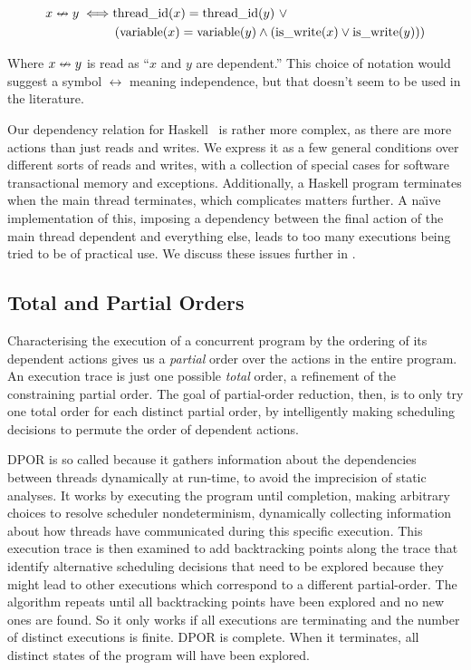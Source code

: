 \begin{align*}
  x \nleftrightarrow y \iff& \mathrm{thread\_id}(x) = \mathrm{thread\_id}(y)~\lor\\
    &\left(\mathrm{variable}(x) = \mathrm{variable}(y)
     \land \left(\mathrm{is\_write}(x) \lor \mathrm{is\_write}(y)\right)\right)
\end{align*}

Where $x \nleftrightarrow y$ is read as ``$x$ and $y$ are dependent.''  This
choice of notation would suggest a symbol $\leftrightarrow$ meaning
independence, but that doesn't seem to be used in the literature.

Our dependency relation for Haskell~ is rather
more complex, as there are more actions than just reads and writes.
We express it as a few general conditions over different sorts of
reads and writes, with a collection of special cases for software
transactional memory and exceptions.  Additionally, a Haskell program
terminates when the main thread terminates, which complicates matters
further.  A na\"{\i}ve implementation of this, imposing a dependency
between the final action of the main thread dependent and everything
else, leads to too many executions being tried to be of practical use.
We discuss these issues further in .

\subsection{Total and Partial Orders}

Characterising the execution of a concurrent program by the ordering
of its dependent actions gives us a \emph{partial} order over the
actions in the entire program.  An execution trace is just one
possible \emph{total} order, a refinement of the constraining partial
order.  The goal of partial-order reduction, then, is to only try one
total order for each distinct partial order, by intelligently making
scheduling decisions to permute the order of dependent actions.

DPOR is so called because it gathers information about the
dependencies between threads dynamically at run-time, to avoid the
imprecision of static analyses\cite{flanagan2005}.  It works by
executing the program until completion, making arbitrary choices to
resolve scheduler nondeterminism, dynamically collecting information
about how threads have communicated during this specific execution.
This execution trace is then examined to add backtracking points along
the trace that identify alternative scheduling decisions that need to
be explored because they might lead to other executions which
correspond to a different partial-order.  The algorithm repeats until
all backtracking points have been explored and no new ones are found.
So it only works if all executions are terminating and the number of
distinct executions is finite.  DPOR is complete.  When it terminates,
all distinct states of the program will have been explored.

